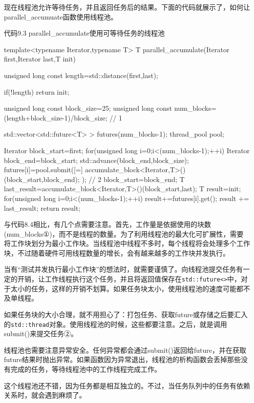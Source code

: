 现在线程池允许等待任务，并且返回任务后的结果。下面的代码就展示了，如何让parallel\_accumuate函数使用线程池。

代码9.3 parallel\_accumulate使用可等待任务的线程池

\begin{cpp}
template<typename Iterator,typename T>
T parallel_accumulate(Iterator first,Iterator last,T init)
{
  unsigned long const length=std::distance(first,last);

  if(!length)
    return init;

  unsigned long const block_size=25;
  unsigned long const num_blocks=(length+block_size-1)/block_size;  // 1

  std::vector<std::future<T> > futures(num_blocks-1);
  thread_pool pool;

  Iterator block_start=first;
  for(unsigned long i=0;i<(num_blocks-1);++i)
  {
    Iterator block_end=block_start;
    std::advance(block_end,block_size);
    futures[i]=pool.submit([=]{
      accumulate_block<Iterator,T>()(block_start,block_end);
    }); // 2
    block_start=block_end;
  }
  T last_result=accumulate_block<Iterator,T>()(block_start,last);
  T result=init;
  for(unsigned long i=0;i<(num_blocks-1);++i)
  {
    result+=futures[i].get();
  }
  result += last_result;
  return result;
}
\end{cpp}

与代码8.4相比，有几个点需要注意。首先，工作量是依据使用的块数(num\_blocks①)，而不是线程的数量。为了利用线程池的最大化可扩展性，需要将工作块划分为最小工作块。当线程池中线程不多时，每个线程将会处理多个工作块，不过随着硬件可用线程数量的增长，会有越来越多的工作块并发执行。

当有“测试并发执行最小工作块”的想法时，就需要谨慎了。向线程池提交任务有一定的开销，让工作线程执行这个任务，并且将返回值保存在\texttt{std::future<>}中，对于太小的任务，这样的开销不划算。如果任务块太小，使用线程池的速度可能都不及单线程。

如果任务块的大小合理，就不用担心了：打包任务、获取future或存储之后要汇入的\texttt{std::thread}对象。使用线程池的时候，这些都要注意。之后，就是调用submit()来提交任务②。

线程池也需要注意异常安全。任何异常都会通过submit()返回给future，并在获取future结果时抛出异常。如果函数因为异常退出，线程池的析构函数会丢掉那些没有完成的任务，等待线程池中的工作线程完成工作。

这个线程池还不错，因为任务都是相互独立的。不过，当任务队列中的任务有依赖关系时，就会遇到麻烦了。


